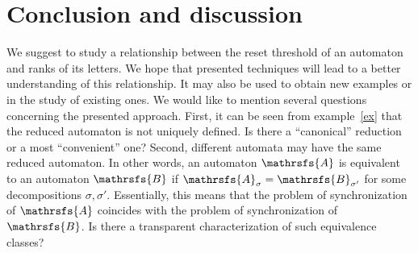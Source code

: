 \documentclass[11pt]{llncs}
\newcommand{\A}{\mathrsfs{A}}
\begin{document}
\section{Conclusion and discussion}
We suggest to study a relationship between the reset threshold of an automaton and ranks of its letters. We hope that presented techniques
will lead to a better understanding of this relationship. It may also be used to obtain new examples or in the study of existing ones. We
would like to mention several questions concerning the presented approach. First, it can be seen from example~\ref{ex} that the reduced
automaton is not uniquely defined. Is there a ``canonical'' reduction or a most ``convenient'' one? Second, different automata may have the
same reduced automaton. In other words, an automaton $\A$ is equivalent to an automaton $\mathrsfs{B}$ if $\mathrsfs{A}_{\sigma} =
\mathrsfs{B}_{\sigma'}$ for some decompositions $\sigma, \sigma'$. Essentially, this means that the problem of synchronization of $\A$
coincides with the problem of synchronization of $\mathrsfs{B}$. Is there a transparent characterization of such equivalence classes?
\end{document}
